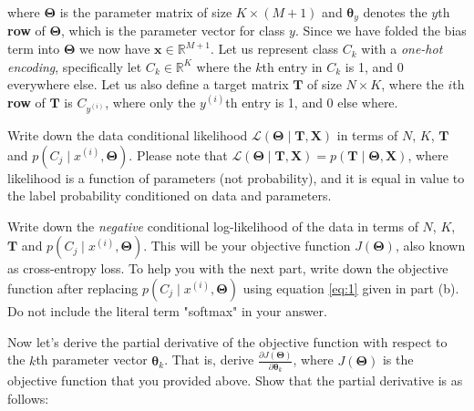 \documentclass[11pt]{exam}
\numberwithin{equation}{section} %
\numberwithin{figure}{section} %
\numberwithin{table}{section} %
\newcommand{\Rb}{\mathbb{R}}
\newcommand{\xv}{\mathbf{x}}
\newcommand{\Tv}{\mathbf{T}}
\newcommand{\Xv}{\mathbf{X}}
\newcommand{\thetav     }{\boldsymbol \theta     }
\newcommand{\Thetav     }{\boldsymbol \Theta     }
\begin{document}
\begin{questions}
    where $\Thetav$ is the parameter matrix of size $K \times (M + 1)$ and $\thetav_y$ denotes the $y$th \textbf{row} of $\Thetav$, which is the parameter vector for class $y$. Since we have folded the bias term into $\Thetav$ we now have $\xv \in \Rb^{M + 1}$. Let us represent class $C_k$ with a \emph{one-hot encoding}, specifically let $C_k \in \Rb^K$ where the $k$th entry in $C_k$ is 1, and 0 everywhere else. Let us also define a target matrix $\Tv$ of size $N \times K$, where the $i$th {\bf row} of $\Tv$ is $C_{y^{(i)}}$, where only the  $y^{(i)}$th entry is 1, and 0 else where.
    
    Write down the data conditional likelihood $ \mathcal{L}(\Thetav \mid \Tv, \Xv)$ in terms of $N$, $K$, $\Tv$ and $p\left(C_j \mid x^{(i)}, \Thetav \right)$. Please note that $\mathcal{L}(\Thetav \mid \Tv, \Xv) = p(\Tv \mid \Thetav, \Xv)$, where likelihood is a function of parameters (not probability), and it is equal in value to the label probability conditioned on data and parameters.
    
    \begin{your_solution}
    \bigskip \bigskip \bigskip \bigskip \bigskip \bigskip \bigskip \bigskip
    \bigskip \bigskip \bigskip \bigskip \bigskip
  
    \end{your_solution}
    
    
    \question [1] Write down the \emph{negative} conditional log-likelihood of the data in terms of $N$, $K$, $\Tv$ and $p\left(C_j \mid x^{(i)}, \Thetav \right)$. This will be your objective function $J(\Thetav)$, also known as cross-entropy loss. To help you with the next part, write down the objective function after replacing $p\left(C_j \mid x^{(i)}, \Thetav \right)$ using equation \ref{eq:1} given in part (b). Do not include the literal term "softmax" in your answer.
    
    \begin{your_solution}
    \bigskip \bigskip \bigskip \bigskip \bigskip \bigskip \bigskip \bigskip
    \bigskip \bigskip \bigskip \bigskip \bigskip \bigskip \bigskip \bigskip
  
    \end{your_solution}

    \clearpage
    
    \question [4] Now let's derive the partial derivative of the objective function with respect to the $k$th parameter vector $\thetav_k$. That is, derive $\frac{ \partial J(\Thetav) }{ \partial \thetav_k}$, where $J(\Thetav)$ is the objective function that you provided above. Show that the partial derivative  is as follows:


\end{questions}
\end{document}
